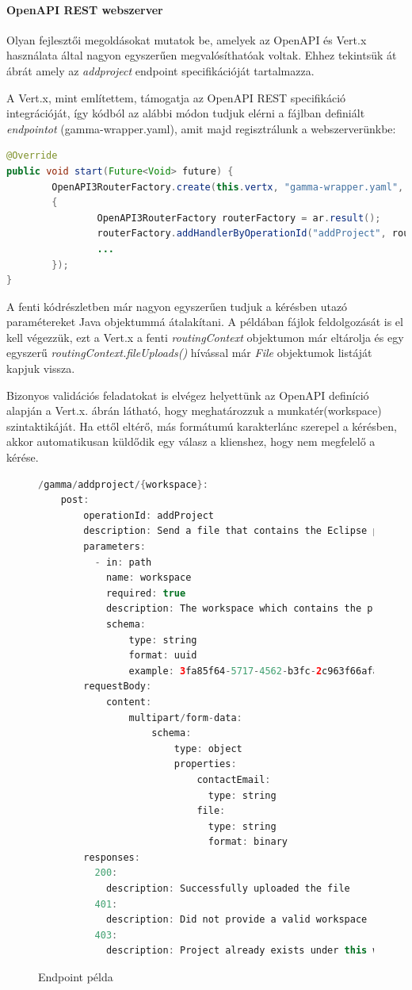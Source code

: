 \paragraph{OpenAPI REST webszerver} Olyan fejlesztői megoldásokat mutatok be, amelyek az OpenAPI és Vert.x használata által nagyon egyszerűen megvalósíthatóak voltak. Ehhez tekintsük át  ábrát amely az \textit{addproject} endpoint specifikációját tartalmazza.

A Vert.x, mint említettem, támogatja az OpenAPI REST specifikáció integrációját, így kódból az alábbi módon tudjuk elérni a fájlban definiált \textit{endpointot} (gamma-wrapper.yaml), amit majd regisztrálunk a webszerverünkbe:
\begin{lstlisting}[language=Java]
@Override
public void start(Future<Void> future) {
        OpenAPI3RouterFactory.create(this.vertx, "gamma-wrapper.yaml", ar ->
		{
               	OpenAPI3RouterFactory routerFactory = ar.result();
                routerFactory.addHandlerByOperationId("addProject", routingContext -> {	... });
				...	
		});
}
\end{lstlisting}
A fenti kódrészletben már nagyon egyszerűen tudjuk a kérésben utazó paramétereket Java objektummá átalakítani. A példában fájlok feldolgozását is el kell végezzük, ezt a Vert.x a fenti \textit{routingContext} objektumon már eltárolja és egy egyszerű \textit{routingContext.fileUploads()} hívással már \textit{File} objektumok listáját kapjuk vissza.


Bizonyos validációs feladatokat is elvégez helyettünk az OpenAPI definíció alapján a Vert.x.  ábrán látható, hogy meghatározzuk a munkatér(workspace) szintaktikáját. Ha ettől eltérő, más formátumú karakterlánc szerepel a kérésben, akkor automatikusan küldődik egy válasz a klienshez, hogy nem megfelelő a kérése.



\begin{figure}[!ht]
\begin{lstlisting}[language=Java]
 /gamma/addproject/{workspace}:
	post:
		operationId: addProject
		description: Send a file that contains the Eclipse project on which the gamma operations will run
		parameters:
		  - in: path
			name: workspace
			required: true
			description: The workspace which contains the project
			schema:
				type: string
				format: uuid
				example: 3fa85f64-5717-4562-b3fc-2c963f66afa6
		requestBody:
			content:
				multipart/form-data:
					schema:
						type: object
						properties:
							contactEmail:
  							  type: string
							file:
							  type: string
							  format: binary
		responses:
		  200:
			description: Successfully uploaded the file
		  401:
			description: Did not provide a valid workspace
		  403:
			description: Project already exists under this workspace, delete it and resend this request

\end{lstlisting}
	\caption{Endpoint példa}
	\label{fig:endpoint_example}
\end{figure}

